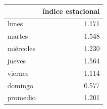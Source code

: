 \begin{tabular}{lr}
\toprule
 & índice estacional \\
\midrule
lunes & 1.171 \\
martes & 1.548 \\
miércoles & 1.230 \\
jueves & 1.564 \\
viernes & 1.114 \\
domingo & 0.577 \\
promedio & 1.201 \\
\bottomrule
\end{tabular}
